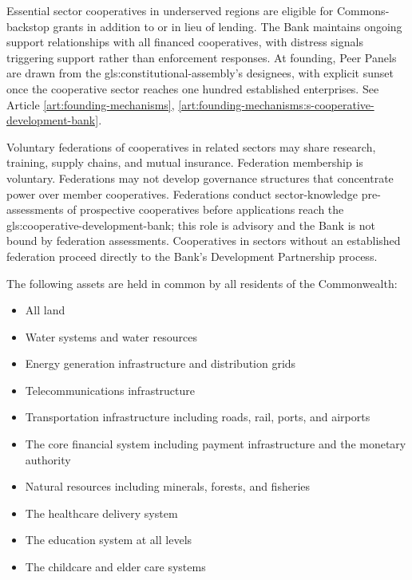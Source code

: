 Essential sector cooperatives in underserved regions are eligible for Commons-backstop grants in addition to or in lieu of lending. The Bank maintains ongoing support relationships with all financed cooperatives, with distress signals triggering support rather than enforcement responses. At founding, Peer Panels are drawn from the \gls{gls:constitutional-assembly}'s designees, with explicit sunset once the cooperative sector reaches one hundred established enterprises. See Article \ref{art:founding-mechanisms}, \ref{art:founding-mechanisms:s-cooperative-development-bank}.

Voluntary federations of cooperatives in related sectors may share research, training, supply chains, and mutual insurance. Federation membership is voluntary. Federations may not develop governance structures that concentrate power over member cooperatives. Federations conduct sector-knowledge pre-assessments of prospective cooperatives before applications reach the \gls{gls:cooperative-development-bank}; this role is advisory and the Bank is not bound by federation assessments. Cooperatives in sectors without an established federation proceed directly to the Bank's Development Partnership process.


The following assets are held in common by all residents of the Commonwealth:
\begin{itemize}
  \item All land
  \item Water systems and water resources
  \item Energy generation infrastructure and distribution grids
  \item Telecommunications infrastructure
  \item Transportation infrastructure including roads, rail, ports, and airports
  \item The core financial system including payment infrastructure and the monetary authority
  \item Natural resources including minerals, forests, and fisheries
  \item The healthcare delivery system
  \item The education system at all levels
  \item The childcare and elder care systems
\end{itemize}

